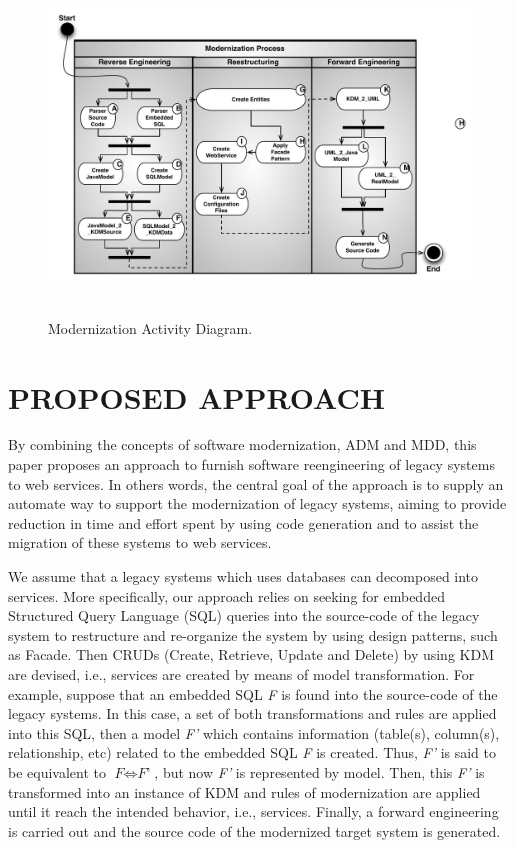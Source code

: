 \documentclass[a4paper,twoside]{article}
\begin{document}
 \begin{figure}[!t]
\centering
  \includegraphics[width=16.8cm, height=9cm]{figuras/AllProcess4}
\caption{Modernization Activity Diagram.}
\label{fig:activity_diagram}
\end{figure}

\section{\uppercase{Proposed Approach}}
\label{sec:proposed_approach}


\noindent By combining the concepts of software modernization, ADM and MDD, this paper proposes an approach to furnish software reengineering of legacy systems to web services. In others words, the central goal of the approach is to supply an automate way to support the modernization of legacy systems, aiming to provide reduction in time and effort spent by using code generation and to assist the migration of these systems to web services.  

We assume that a legacy systems which uses databases can decomposed into services. More specifically, our approach relies on seeking for embedded Structured Query Language (SQL) queries into the source-code of the legacy system  to restructure and re-organize the system by using design patterns, such as Facade. Then CRUDs (Create, Retrieve, Update and Delete) by using KDM are devised, i.e., services are created by means of model transformation. For example, suppose that an embedded SQL \textit{F} is found into the source-code of the legacy systems. In this case, a set of both transformations and rules are applied into this SQL, then a model \textit{F'} which contains information (table(s), column(s), relationship, etc) related to the embedded SQL \textit{F} is created. Thus, \textit{F'} is said to be equivalent to $\textit{F} \Leftrightarrow \textit{F'} $, but now \textit{F'} is represented by model. Then, this \textit{F'} is transformed into an instance of KDM and rules of modernization are applied until it reach the intended behavior, i.e., services. Finally, a forward engineering is carried out and the source code of the modernized target system is generated. 
\end{document}
